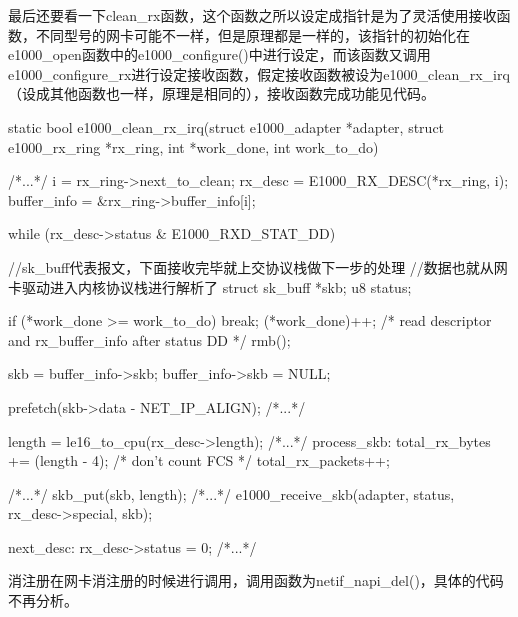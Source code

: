 \documentclass[fontsize=11pt, %
                             paper=a4, %
                             oneside, %
                             captions=tableheading,
                             index=totoc,
                             hyperref]{labbook}
\begin{document}
\begin{addmargin}[0cm]{0cm}
\indent 最后还要看一下clean\_rx函数，这个函数之所以设定成指针是为了灵活使用接收函数，不同型号的网卡可能不一样，但是原理都是一样的，该指针的初始化在e1000\_open函数中的e1000\_configure()中进行设定，而该函数又调用e1000\_configure\_rx进行设定接收函数，假定接收函数被设为e1000\_clean\_rx\_irq（设成其他函数也一样，原理是相同的），接收函数完成功能见代码。\\
\begin{pyglist}[language=c,caption={e1000\_clean\_rx\_irq},listingname=\textbf{Program},
	listingnamefont=\sffamily\bfseries\color{yellow},%
        captionfont=\sffamily\color{white},captionbgcolor=gray,
        fvset={frame=bottomline,framerule=4pt,rulecolor=\color{gray}}
        ]

static bool e1000_clean_rx_irq(struct e1000_adapter *adapter,
			       struct e1000_rx_ring *rx_ring,
			       int *work_done, int work_to_do)
{
  /*...*/
  i = rx_ring->next_to_clean;
  rx_desc = E1000_RX_DESC(*rx_ring, i);
  buffer_info = &rx_ring->buffer_info[i];

  while (rx_desc->status & E1000_RXD_STAT_DD) {
    //sk_buff代表报文，下面接收完毕就上交协议栈做下一步的处理
    //数据也就从网卡驱动进入内核协议栈进行解析了
    struct sk_buff *skb;
    u8 status;

    if (*work_done >= work_to_do)
      break;
    (*work_done)++;
   /* read descriptor and rx_buffer_info after status DD */
    rmb(); 

    skb = buffer_info->skb;
    buffer_info->skb = NULL;

    prefetch(skb->data - NET_IP_ALIGN);
    /*...*/

    length = le16_to_cpu(rx_desc->length);
    /*...*/
    process_skb:
      total_rx_bytes += (length - 4); /* don't count FCS */
      total_rx_packets++;

    /*...*/
    skb_put(skb, length);
    /*...*/
    e1000_receive_skb(adapter, status, rx_desc->special, skb);

    next_desc:
      rx_desc->status = 0;
    /*...*/
    }
}
\end{pyglist}
\indent 消注册在网卡消注册的时候进行调用，调用函数为netif\_napi\_del()，具体的代码不再分析。






\end{addmargin}
\end{document}

